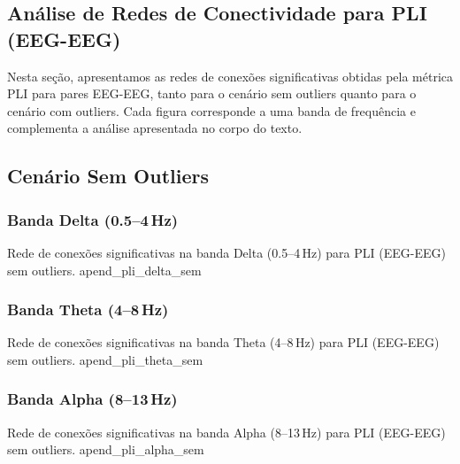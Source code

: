 \begin{apendicesenv}

  \partapendices

  \chapter{Análise de Redes de Conectividade para PLI (EEG-EEG)}
  \label{apendice:pli_eeg_eeg}
  Nesta seção, apresentamos as redes de conexões significativas obtidas pela métrica PLI para pares EEG-EEG, tanto para o cenário sem outliers quanto para o cenário com outliers. Cada figura corresponde a uma banda de frequência e complementa a análise apresentada no corpo do texto.
  
  \section{Cenário Sem Outliers}
  
  \subsection{Banda Delta (0.5--4\,Hz)}
  {Rede de conexões significativas na banda Delta (0.5--4\,Hz) para PLI (EEG-EEG) sem outliers.}
  {apend_pli_delta_sem}
  
  \subsection{Banda Theta (4--8\,Hz)}
  {Rede de conexões significativas na banda Theta (4--8\,Hz) para PLI (EEG-EEG) sem outliers.}
  {apend_pli_theta_sem}
  
  \subsection{Banda Alpha (8--13\,Hz)}
  {Rede de conexões significativas na banda Alpha (8--13\,Hz) para PLI (EEG-EEG) sem outliers.}
  {apend_pli_alpha_sem}
  

\end{apendicesenv}
